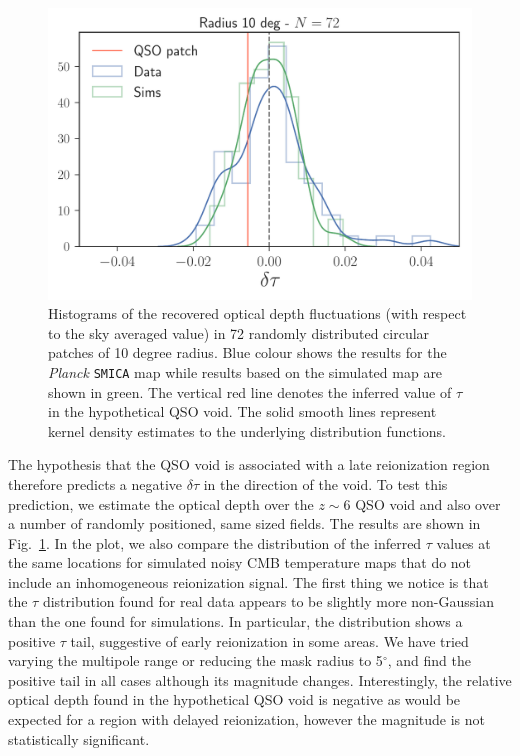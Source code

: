 \documentclass[]{pasa}
\begin{document}
\begin{figure}
\includegraphics[width=\columnwidth]{hist_plot}%
\caption{Histograms of the recovered optical depth fluctuations (with respect to the sky averaged value) in 72 randomly distributed circular patches of 10 degree radius. Blue colour shows the results for the \textit{Planck} \texttt{SMICA} map while results based on the simulated map are shown in green. The vertical red line denotes the inferred value of $\tau$ in the hypothetical QSO void. The solid smooth lines represent kernel density estimates to the underlying distribution functions.}
\label{fig:tau_hist}
\end{figure}

The hypothesis that the QSO void is associated with a late reionization region therefore predicts  a negative $\delta\tau$ in the direction of the void. 
  To test this prediction, we estimate the optical depth over the $z \sim 6$ QSO void and also over a number of randomly positioned, same sized fields.
The results are shown in Fig.~\ref{fig:tau_hist}. 
  In the plot, we also compare the distribution of the inferred $\tau$ values at the same locations for  simulated noisy CMB temperature maps that do not include an inhomogeneous reionization signal. The first thing we notice is that the $\tau$ distribution found for real data appears to be slightly more non-Gaussian than the one found for simulations. 
  In particular, the distribution shows a positive $\tau$ tail, suggestive of early reionization in some areas. 
  We have tried varying the multipole range or reducing the mask radius to 5$^\circ$, and find the positive tail in all cases although its magnitude changes. 
Interestingly, the relative optical depth found in the hypothetical QSO void is negative as would be expected for a region with delayed reionization, however the magnitude is not statistically significant. 
\end{document}
